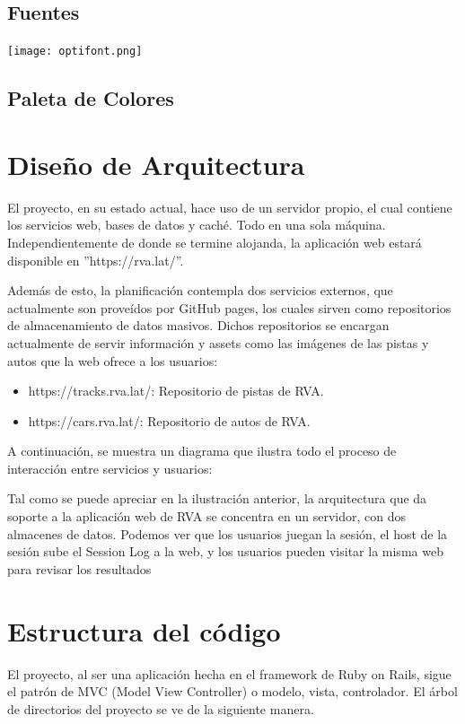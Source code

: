 \subsection{Fuentes}

\begin{center}
  \texttt{[image: optifont.png]}
\end{center}

\subsection{Paleta de Colores}

\section{Diseño de Arquitectura}
El proyecto, en su estado actual, hace uso de un servidor propio, el cual contiene los servicios web, bases de datos y caché. Todo en una sola máquina. Independientemente de donde se termine alojanda, la aplicación web estará disponible en ''https://rva.lat/''.

Además de esto, la planificación contempla dos servicios externos, que actualmente son proveídos por GitHub pages, los cuales sirven como repositorios de almacenamiento de datos masivos. Dichos repositorios se encargan actualmente de servir información y assets como las imágenes de las pistas y autos que la web ofrece a los usuarios:

\begin{itemize}
	\item https://tracks.rva.lat/: Repositorio de pistas de RVA.
	\item https://cars.rva.lat/: Repositorio de autos de RVA.
\end{itemize}

A continuación, se muestra un diagrama que ilustra todo el proceso de interacción entre servicios y usuarios:

Tal como se puede apreciar en la ilustración anterior, la arquitectura que da soporte a la aplicación web de RVA se concentra en un servidor, con dos almacenes de datos. Podemos ver que los usuarios juegan la sesión, el host de la sesión sube el Session Log a la web, y los usuarios pueden visitar la misma web para revisar los resultados

\newpage

\section{Estructura del código}
El proyecto, al ser una aplicación hecha en el framework de Ruby on Rails, sigue el patrón de MVC (Model View Controller) o modelo, vista, controlador. El árbol de directorios del proyecto se ve de la siguiente manera.

